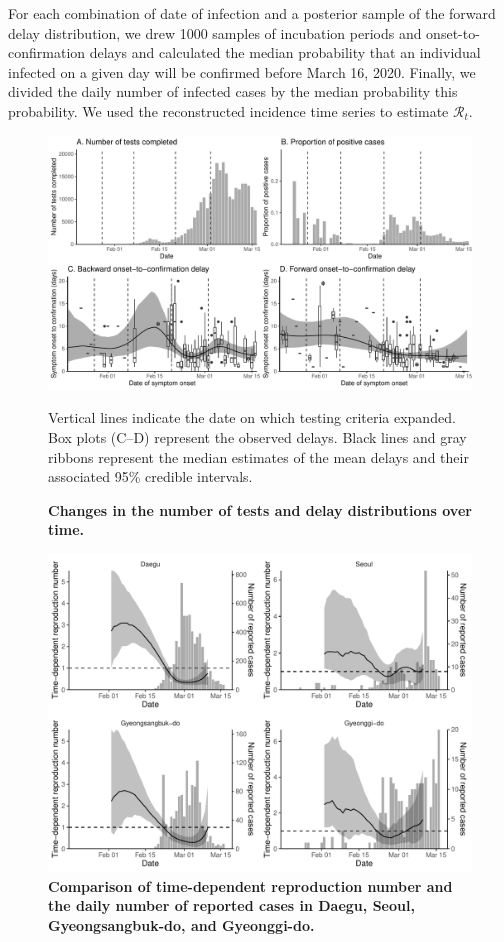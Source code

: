 For each combination of date of infection and a posterior sample of the forward delay distribution, we drew 1000 samples of incubation periods and onset-to-confirmation delays and calculated the median probability that an individual infected on a given day will be confirmed before March 16, 2020.
Finally, we divided the daily number of infected cases by the median probability this probability.
We used the reconstructed incidence time series to estimate $\mathcal R_t$.

\pagebreak

\begin{figure}[!ht]
\includegraphics[width=\textwidth]{figure_report_delay.pdf}
\caption{
\textbf{Changes in the number of tests and delay distributions over time.}
}
Vertical lines indicate the date on which testing criteria expanded.
Box plots (C--D) represent the observed delays.
Black lines and gray ribbons represent the median estimates of the mean delays and their associated 95\% credible intervals.
\end{figure}

\pagebreak

\begin{figure}[!ht]
\includegraphics[width=\textwidth]{figure_R_t_all.pdf}
\caption{
\textbf{Comparison of time-dependent reproduction number and the daily number of reported cases in Daegu, Seoul, Gyeongsangbuk-do, and Gyeonggi-do.}
}
\end{figure}

